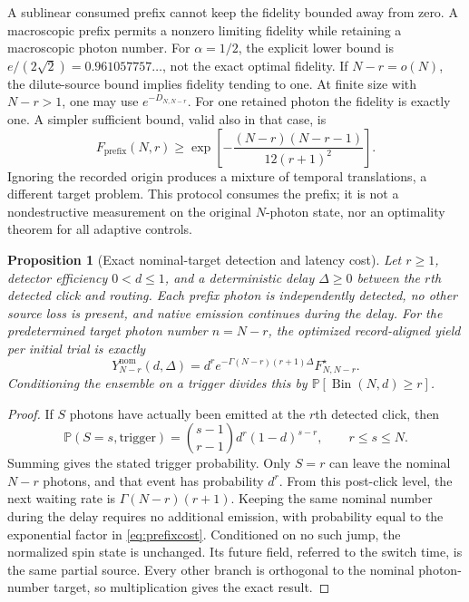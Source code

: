 \documentclass[11pt,a4paper]{article}
\newtheorem{proposition}[theorem]{Proposition}
\newcommand{\Prob}{\mathbb P}
\newcommand{\Bin}{\operatorname{Bin}}
\begin{document}
A sublinear consumed prefix cannot keep the fidelity bounded away
from zero. A macroscopic prefix permits a nonzero limiting
fidelity while retaining a macroscopic photon number.
For \(\alpha=1/2\), the explicit lower bound is
\(e/(2\sqrt2)=0.961057757\ldots\), not the exact optimal fidelity.
If \(N-r=o(N)\), the dilute-source bound implies fidelity tending
to one. At finite size with \(N-r>1\), one may use
\(e^{-D_{N,N-r}}\). For one retained photon the fidelity is exactly
one. A simpler sufficient bound, valid also in that case, is
\begin{equation}
 F_{\mathrm{prefix}}(N,r)\ge
 \exp\!\left[-\frac{(N-r)(N-r-1)}{12(r+1)^2}\right].
\end{equation}
Ignoring the recorded origin produces a mixture of temporal
translations, a different target problem. This protocol consumes
the prefix; it is not a nondestructive measurement on the original
\(N\)-photon state, nor an optimality theorem for all adaptive controls.

\begin{proposition}[Exact nominal-target detection and latency cost]
Let \(r\ge1\), detector efficiency \(0<d\le1\), and a deterministic
delay \(\Delta\ge0\) between the \(r\)th detected click and routing.
Each prefix photon is independently detected, no other source
loss is present, and native emission continues during the delay.
For the predetermined target photon number \(n=N-r\), the optimized
record-aligned yield per initial trial is exactly
\begin{equation}
 Y_{N-r}^{\mathrm{nom}}(d,\Delta)
 =d^r e^{-\Gamma(N-r)(r+1)\Delta}F_{N,N-r}^\star.
 \label{eq:prefixcost}
\end{equation}
Conditioning the ensemble on a trigger divides this by
\(\Prob[\Bin(N,d)\ge r]\).
\end{proposition}
\begin{proof}
If \(S\) photons have actually been emitted at the \(r\)th detected
click, then
\begin{equation}
 \Prob(S=s,\mathrm{trigger})
 =\binom{s-1}{r-1}d^r(1-d)^{s-r},\qquad r\le s\le N.
\end{equation}
Summing gives the stated trigger probability. Only \(S=r\) can
leave the nominal \(N-r\) photons, and that event has probability
\(d^r\). From this post-click level, the next waiting rate is
\(\Gamma(N-r)(r+1)\). Keeping the same nominal number during the
delay requires no additional emission, with probability equal to
the exponential factor in \eqref{eq:prefixcost}. Conditioned on no
such jump, the normalized spin state is unchanged. Its future
field, referred to the switch time, is the same partial source.
Every other branch is orthogonal to the nominal photon-number
target, so multiplication gives the exact result.
\end{proof}
\end{document}
